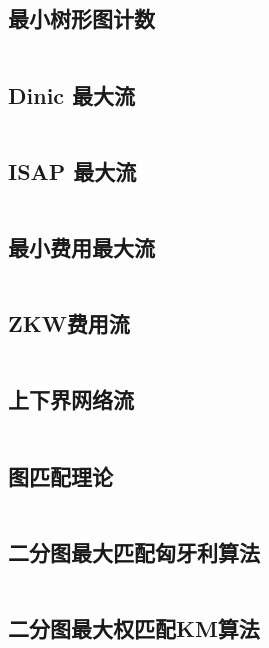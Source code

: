 \inputminted{cpp}{code/determinant.cc}

\subsection{最小树形图计数} 

\inputminted{cpp}{code/zhuliucount.cc}

\subsection{Dinic 最大流} 

\inputminted{cpp}{code/Dinic.cc}

\subsection{ISAP 最大流} 

\inputminted{cpp}{code/ISAP.cc}

\subsection{最小费用最大流} 

\inputminted{cpp}{code/mincost_maxflow.cc}

\subsection{ZKW费用流} 

\inputminted{cpp}{code/zkwCostFlow.cc}

\subsection{上下界网络流} 

\inputminted{cpp}{code/upperlowerFlow.cc}

\subsection{图匹配理论} 

\inputminted{text}{code/Binarymatching.txt}

\subsection{二分图最大匹配匈牙利算法} 

\inputminted{text}{code/hungary.cc }

\subsection{二分图最大权匹配KM算法} 

